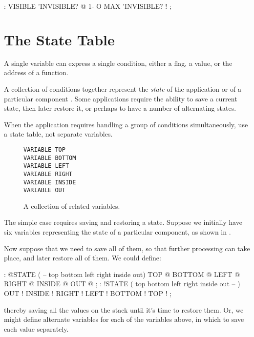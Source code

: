 \begin{Code}
: VISIBLE   'INVISIBLE? @  1-  O MAX  'INVISIBLE? ! ;
\end{Code}

\section{The State Table}

A single variable can express a single condition, either a flag, a value, or
the address of a function.

A collection of conditions together represent the \emph{state} of the
application or of a particular component \cite{slater83}. Some applications require the
ability to save a current state, then later restore it, or perhaps to have a
number of alternating states.

\begin{tip}
When the application requires handling a group of conditions
simultaneously, use a state table, not separate variables.
\end{tip}
\begin{figure*}[hhhh]
\caption{A collection of related variables.}
\begin{center}
\begin{BVerbatim}
VARIABLE TOP
VARIABLE BOTTOM
VARIABLE LEFT
VARIABLE RIGHT
VARIABLE INSIDE
VARIABLE OUT
\end{BVerbatim}
\end{center}
\end{figure*}

The simple case requires saving and restoring a state. Suppose we initially
have six variables representing the state of a particular component, as
shown in .

Now suppose that we need to save all of them, so that further processing
can take place, and later restore all of them. We could define:

\begin{Code}
: @STATE ( -- top bottom left right inside out)
   TOP @  BOTTOM @  LEFT @  RIGHT @  INSIDE @  OUT @ ;
: !STATE ( top bottom left right inside out -- )
   OUT !  INSIDE !  RIGHT !  LEFT !  BOTTOM !  TOP ! ;
\end{Code}
thereby saving all the values on the stack until it's time to restore them.
Or, we might define alternate variables for each of the variables above, in
which to save each value separately.

